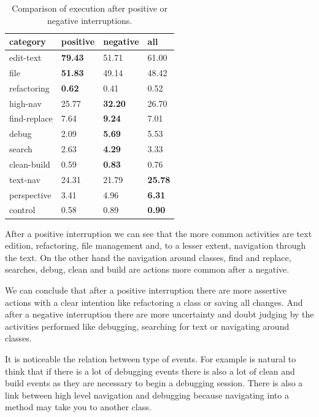 \documentclass[conference]{IEEEtran}
\begin{document}
\begin{table}[ht!]
\renewcommand{\arraystretch}{1.3}
\caption{Comparison of execution after positive or negative interruptions. }
\label{tbl:stats_events}
\centering
\begin{tabular}{|p{1.7cm}|p{1cm} |p{1cm}|p{1cm}|} 
  \hline 
category & positive & negative & all \\  
  \hline 
    \hline 
edit-text &  \textbf{79.43} & 51.71 & 61.00 \\
file &  \textbf{51.83} & 49.14 & 48.42\\
refactoring & \textbf{0.62} & 0.41 & 0.52 \\
high-nav & 25.77 & \textbf{32.20} & 26.70  \\
find-replace & 7.64 & \textbf{9.24} & 7.01 \\
debug & 2.09 & \textbf{5.69} & 5.53  \\
search & 2.63 & \textbf{4.29} & 3.33 \\
clean-build & 0.59 & \textbf{0.83} & 0.76  \\
text-nav & 24.31 & 21.79 & \textbf{25.78} \\
perspective & 3.41 & 4.96 & \textbf{6.31}  \\
control & 0.58 & 0.89 & \textbf{0.90} \\
\hline
\end{tabular}
\end{table}

After a positive interruption we can see that the more common activities are text edition, refactoring, file management and, to a lesser extent, navigation through the text. On the other hand the navigation around classes, find and replace, searches, debug, clean and build are actions more common after a negative.

We can conclude that after a positive interruption there are more assertive actions with a clear intention like refactoring a class or saving all changes. And after a negative interruption there are more uncertainty and doubt judging by the activities performed like debugging, searching for text or navigating around classes.

It is noticeable the relation between type of events. For example is natural to think that if there is a lot of debugging events there is also a lot of clean and build events as they are necessary to begin a debugging session. There is also a link between high level navigation and debugging because navigating into a method may take you to another class.
\end{document}
